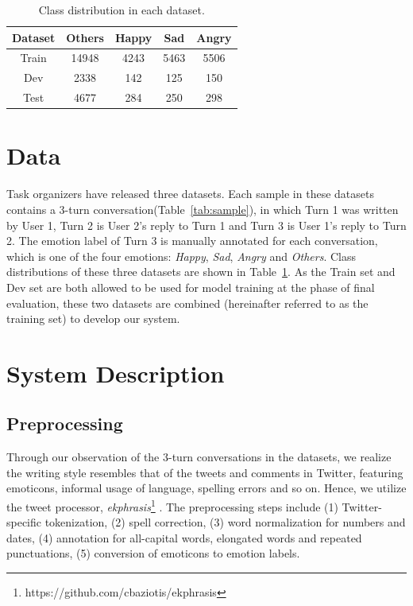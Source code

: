 \documentclass[11pt,a4paper]{article}
\begin{document}
\begin{table}\small
\begin{center}
\begin{tabular}{c|c c c c}
\hline
\bf Dataset & \bf Others & \bf Happy & \bf Sad & \bf Angry \\
\hline
Train & 14948 & 4243 & 5463 & 5506 \\
Dev & 2338 & 142 & 125 & 150 \\
Test & 4677 & 284 & 250 & 298 \\
\hline
\end{tabular}
\end{center}
\caption{\label{tab:dataset} Class distribution in each dataset.}
\end{table}

\section{Data}
\label{sec:data}

Task organizers have released three datasets. Each sample in these datasets contains a 3-turn conversation(Table~\ref{tab:sample}), in which Turn 1 was written by User 1, Turn 2 is User 2's reply to Turn 1 and Turn 3 is User 1's reply to Turn 2. The emotion label of Turn 3 is manually annotated for each conversation, which is one of the four emotions: {\em Happy}, {\em Sad}, {\em Angry} and {\em Others}. Class distributions of these three datasets are shown in Table~\ref{tab:dataset}. As the Train set and Dev set are both allowed to be used for model training at the phase of final evaluation, these two datasets are combined (hereinafter referred to as the training set) to develop our system.

\section{System Description}
\label{sec:system_desc}

\subsection{Preprocessing}

Through our observation of the 3-turn conversations in the datasets, we realize the writing style resembles that of the tweets and comments in Twitter, featuring emoticons, informal usage of language, spelling errors and so on. Hence, we utilize the tweet processor, {\em ekphrasis}\footnote{https://github.com/cbaziotis/ekphrasis} \cite{Baziotis2017SE1704}. The preprocessing steps include (1) Twitter-specific tokenization, (2) spell correction, (3) word normalization for numbers and dates, (4) annotation for all-capital words, elongated words and repeated punctuations, (5) conversion of emoticons to emotion labels.
\end{document}
